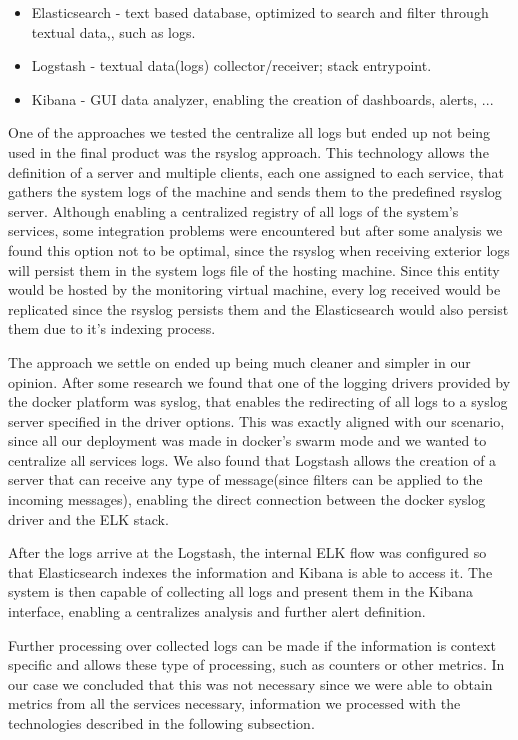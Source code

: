 \documentclass[12pt]{article}
\begin{document}
\begin{itemize}
  \item Elasticsearch - text based database, optimized to search and filter through textual data,, such as logs.
  \item Logstash - textual data(logs) collector/receiver; stack entrypoint.
  \item Kibana - GUI data analyzer, enabling the creation of dashboards, alerts, ...
\end{itemize}

One of the approaches we tested the centralize all logs but ended up not being used in the final product was the rsyslog approach. This technology allows the definition of a server and multiple clients, each one assigned to each service, that gathers the system logs of the machine and sends them to the predefined rsyslog server. Although enabling a centralized registry of all logs of the system's services, some integration problems were encountered but after some analysis we found this option not to be optimal, since the rsyslog when receiving exterior logs will persist them in the system logs file of the hosting machine. Since this entity would be hosted by the monitoring virtual machine, every log received would be replicated since the rsyslog persists them and the Elasticsearch would also persist them due to it's indexing process.

The approach we settle on ended up being much cleaner and simpler in our opinion. After some research we found that one of the logging drivers provided by the docker platform was syslog, that enables the redirecting of all logs to a syslog server specified in the driver options. This was exactly aligned with our scenario, since all our deployment was made in docker's swarm mode and we wanted to centralize all services logs. We also found that Logstash allows the creation of a server that can receive any type of message(since filters can be applied to the incoming messages), enabling the direct connection between the docker syslog driver and the ELK stack.

After the logs arrive at the Logstash, the internal ELK flow was configured so that Elasticsearch indexes the information and Kibana is able to access it. The system is then capable of collecting all logs and present them in the Kibana interface, enabling a centralizes analysis and further alert definition.

Further processing over collected logs can be made if the information is context specific and allows these type of processing, such as counters or other metrics. In our case we concluded that this was not necessary since we were able to obtain metrics from all the services necessary, information we processed with the technologies described in the following subsection.
\end{document}
